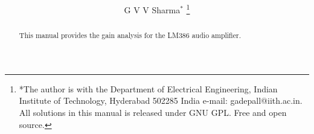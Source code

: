 \documentclass[journal,12pt,twocolumn]{IEEEtran}
\renewcommand\thesection{\arabic{section}}
\begin{document}
\let\StandardTheFigure\thefigure
\renewcommand{\thefigure}{\thesection}



\makeatletter
{}
\makeatother

\let\StandardTheFigure\thefigure
\let\StandardTheTable\thetable
\let\vec\mathbf





\def\putbox#1#2#3{\makebox[0in][l]{\makebox[#1][l]{}\raisebox{\baselineskip}[0in][0in]{\raisebox{#2}[0in][0in]{#3}}}}
     \def\rightbox#1{\makebox[0in][r]{#1}}
     \def\centbox#1{\makebox[0in]{#1}}
     \def\topbox#1{\raisebox{-\baselineskip}[0in][0in]{#1}}
     \def\midbox#1{\raisebox{-0.5\baselineskip}[0in][0in]{#1}}

\vspace{3cm}

\title{ 
}

\author{ G V V Sharma$^{*}$%
	\thanks{*The author is with the Department
		of Electrical Engineering, Indian Institute of Technology, Hyderabad
		502285 India e-mail:  gadepall@iith.ac.in. All solutions in this manual is released under GNU 
GPL.  Free and open source.}
	
}	

\maketitle

\tableofcontents

\bigskip

\renewcommand{\thefigure}{\theenumi}
\renewcommand{\thetable}{\theenumi}

\begin{abstract}
This manual provides the gain analysis for the LM386 audio amplifier. 
\end{abstract}
\end{document}
